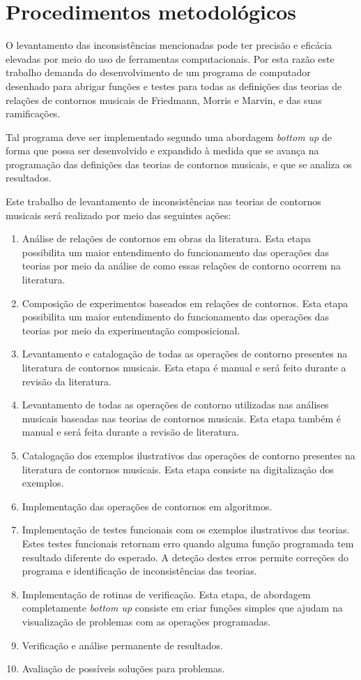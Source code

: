 \documentclass[12pt]{article}
\newcommand{\eng}[1]{\textit{#1}}
\begin{document}
\section{Procedimentos metodológicos}
\label{sec:metodologia}

O levantamento das inconsistências mencionadas pode ter precisão e
eficácia elevadas por meio do uso de ferramentas computacionais. Por
esta razão este trabalho demanda do desenvolvimento de um programa de
computador desenhado para abrigar funções e testes para todas as
definições das teorias de relações de contornos musicais de Friedmann,
Morris e Marvin, e das suas ramificações.

Tal programa deve ser implementado segundo uma abordagem \eng{bottom
  up} \cite{graham94:lisp} de forma que possa ser desenvolvido e
expandido à medida que se avança na programação das definições das
teorias de contornos musicais, e que se analiza os resultados.

Este trabalho de levantamento de inconsistências nas teorias de
contornos musicais será realizado por meio das seguintes ações:

\begin{enumerate}
\item Análise de relações de contornos em obras da literatura. Esta
  etapa possibilita um maior entendimento do funcionamento das
  operações das teorias por meio da análise de como essas relações de
  contorno ocorrem na literatura.
\item Composição de experimentos baseados em relações de contornos.
  Esta etapa possibilita um maior entendimento do funcionamento das
  operações das teorias por meio da experimentação composicional.
\item Levantamento e catalogação de todas as operações de contorno
  presentes na literatura de contornos musicais. Esta etapa é manual e
  será feito durante a revisão da literatura.
\item Levantamento de todas as operações de contorno utilizadas nas
  análises musicais baseadas nas teorias de contornos musicais. Esta
  etapa também é manual e será feita durante a revisão de literatura.
\item Catalogação dos exemplos ilustrativos das operações de contorno
  presentes na literatura de contornos musicais. Esta etapa consiste
  na digitalização dos exemplos.
\item Implementação das operações de contornos em algoritmos.
\item Implementação de testes funcionais com os exemplos ilustrativos
  das teorias. Estes testes funcionais retornam erro quando alguma
  função programada tem resultado diferente do esperado. A deteção
  destes erros permite correções do programa e identificação de
  inconsistências das teorias.
\item Implementação de rotinas de verificação. Esta etapa, de
  abordagem completamente \eng{bottom up} consiste em criar funções
  simples que ajudam na visualização de problemas com as operações
  programadas.
\item Verificação e análise permanente de resultados.
\item Avaliação de possíveis soluções para problemas.
\end{enumerate}
\end{document}
